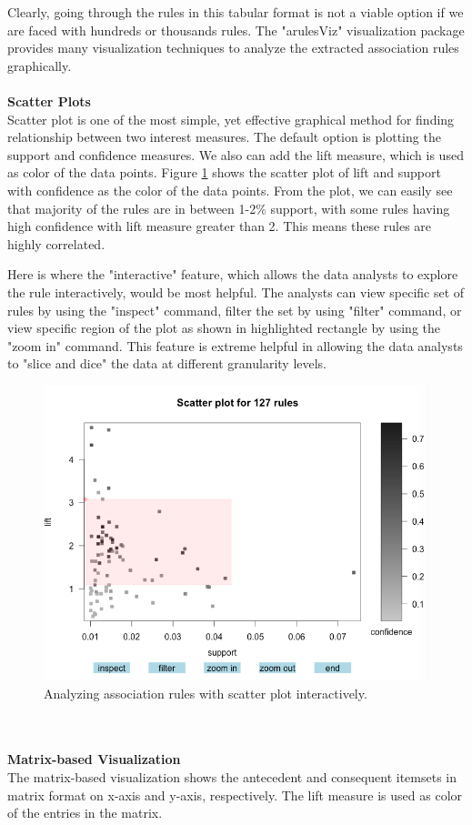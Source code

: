 \documentclass{article}
\begin{document}
Clearly, going through the rules in this tabular format is not a viable option if we are faced with hundreds or thousands rules.  The "arulesViz" visualization package provides many visualization techniques to analyze the extracted association rules graphically.  
\\\\
\textbf{Scatter Plots}\\
Scatter plot is one of the most simple, yet effective graphical method for finding relationship between two interest measures.  The default option is plotting the support and confidence measures.  We also can add the lift measure, which is used as color of the data points.  Figure \ref{fig:interactive} shows the scatter plot of lift and support with confidence as the color of the data points.  From the plot, we can easily see that majority of the rules are in between 1-2\% support, with some rules having high confidence with lift measure greater than 2.  This means these rules are highly correlated.  

Here is where the "interactive" feature, which allows the data analysts to explore the rule interactively, would be most helpful. The analysts can view specific set of rules by using the "inspect" command, filter the set by using "filter" command, or view specific region of the plot as shown in highlighted rectangle by using the "zoom in" command.  This feature is extreme helpful in allowing the data analysts to "slice and dice" the data at different granularity levels.
\begin{figure}[h!]
  \centering
    \includegraphics[width=1.0\textwidth]{images/interactive}
    \caption{Analyzing association rules with scatter plot interactively.}
    \label{fig:interactive}
\end{figure}
\\\\
\textbf{Matrix-based Visualization}\\
The matrix-based visualization shows the antecedent and consequent itemsets in matrix format on x-axis and y-axis, respectively.  The lift measure is used as color of the entries in the matrix.   
\end{document}
